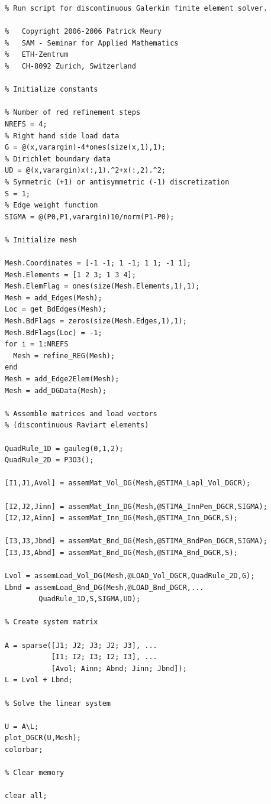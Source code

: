 \begin{lstlisting}
% Run script for discontinuous Galerkin finite element solver.

%   Copyright 2006-2006 Patrick Meury
%   SAM - Seminar for Applied Mathematics
%   ETH-Zentrum
%   CH-8092 Zurich, Switzerland
  
% Initialize constants
  
% Number of red refinement steps
NREFS = 4;                                
% Right hand side load data
G = @(x,varargin)-4*ones(size(x,1),1);    
% Dirichlet boundary data
UD = @(x,varargin)x(:,1).^2+x(:,2).^2;    
% Symmetric (+1) or antisymmetric (-1) discretization
S = 1;                            
% Edge weight function 
SIGMA = @(P0,P1,varargin)10/norm(P1-P0);  
  
% Initialize mesh
  
Mesh.Coordinates = [-1 -1; 1 -1; 1 1; -1 1];
Mesh.Elements = [1 2 3; 1 3 4];
Mesh.ElemFlag = ones(size(Mesh.Elements,1),1);
Mesh = add_Edges(Mesh);         
Loc = get_BdEdges(Mesh);
Mesh.BdFlags = zeros(size(Mesh.Edges,1),1); 
Mesh.BdFlags(Loc) = -1;
for i = 1:NREFS
  Mesh = refine_REG(Mesh);
end
Mesh = add_Edge2Elem(Mesh);
Mesh = add_DGData(Mesh);
    
% Assemble matrices and load vectors
% (discontinuous Raviart elements)
   
QuadRule_1D = gauleg(0,1,2);
QuadRule_2D = P3O3();
  
[I1,J1,Avol] = assemMat_Vol_DG(Mesh,@STIMA_Lapl_Vol_DGCR);
  
[I2,J2,Jinn] = assemMat_Inn_DG(Mesh,@STIMA_InnPen_DGCR,SIGMA);
[I2,J2,Ainn] = assemMat_Inn_DG(Mesh,@STIMA_Inn_DGCR,S);
    
[I3,J3,Jbnd] = assemMat_Bnd_DG(Mesh,@STIMA_BndPen_DGCR,SIGMA);  
[I3,J3,Abnd] = assemMat_Bnd_DG(Mesh,@STIMA_Bnd_DGCR,S);
  
Lvol = assemLoad_Vol_DG(Mesh,@LOAD_Vol_DGCR,QuadRule_2D,G);
Lbnd = assemLoad_Bnd_DG(Mesh,@LOAD_Bnd_DGCR,...
		QuadRule_1D,S,SIGMA,UD);
    
% Create system matrix
       
A = sparse([J1; J2; J3; J2; J3], ...
           [I1; I2; I3; I2; I3], ...
           [Avol; Ainn; Abnd; Jinn; Jbnd]);
L = Lvol + Lbnd;
         
% Solve the linear system
  
U = A\L;
plot_DGCR(U,Mesh);
colorbar;
      
% Clear memory
  
clear all;
\end{lstlisting}

